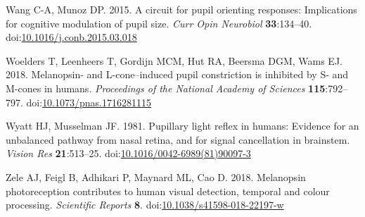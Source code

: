 \documentclass[
]{article}
\newlength{\cslhangindent}
\newlength{\cslentryspacingunit} %
\newenvironment{CSLReferences}[2] %
 {%
  \setlength{\parindent}{0pt}
  \ifodd #1
  \let\oldpar\par
  \def\par{\hangindent=\cslhangindent\oldpar}
  \fi
  \setlength{\parskip}{#2\cslentryspacingunit}
 }%
 {}
\begin{document}
\begin{CSLReferences}{1}{0}
\leavevmode{}%
Wang C-A, Munoz DP. 2015. A circuit for pupil orienting responses: Implications for cognitive modulation of pupil size. \emph{Curr Opin Neurobiol} \textbf{33}:134--40. doi:\href{https://doi.org/10.1016/j.conb.2015.03.018}{10.1016/j.conb.2015.03.018}

\leavevmode{}%
Woelders T, Leenheers T, Gordijn MCM, Hut RA, Beersma DGM, Wams EJ. 2018. Melanopsin- and {L}-cone--induced pupil constriction is inhibited by {S}- and {M}-cones in humans. \emph{Proceedings of the National Academy of Sciences} \textbf{115}:792--797. doi:\href{https://doi.org/10.1073/pnas.1716281115}{10.1073/pnas.1716281115}

\leavevmode{}%
Wyatt HJ, Musselman JF. 1981. Pupillary light reflex in humans: Evidence for an unbalanced pathway from nasal retina, and for signal cancellation in brainstem. \emph{Vision Res} \textbf{21}:513--25. doi:\href{https://doi.org/10.1016/0042-6989(81)90097-3}{10.1016/0042-6989(81)90097-3}

\leavevmode{}%
Zele AJ, Feigl B, Adhikari P, Maynard ML, Cao D. 2018. Melanopsin photoreception contributes to human visual detection, temporal and colour processing. \emph{Scientific Reports} \textbf{8}. doi:\href{https://doi.org/10.1038/s41598-018-22197-w}{10.1038/s41598-018-22197-w}

\end{CSLReferences}
\end{document}
